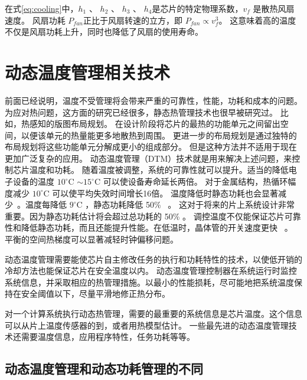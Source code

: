 在式\eqref{eq:cooling}中，$h_1$ 、 $h_2$ 、 $h_3$ 、 $h_4$是芯片的特定物理系数，$v_f$ 是散热风扇速度。
风扇功耗 $P_{fan}$正比于风扇转速的立方，即 $P_{fan} \propto v_f^3$。
这意味着高的温度不仅是风扇功耗上升，同时也降低了风扇的使用寿命。

\section{动态温度管理相关技术}\label{sec:DTM}

前面已经说明，温度不受管理将会带来严重的可靠性，性能，功耗和成本的问题。
为应对热问题，这方面的研究已经很多，静态热管理技术也很早被研究过。
比如，热感知的版图布局规划。
在设计阶段将芯片的最热的功能单元之间留出空间，以便该单元的热量能更多地散热到周围。
更进一步的布局规划是通过独特的布局规划将这些功能单元分解成更小的组成部分。
但是这种方法并不适用于现在更加广泛复杂的应用。
动态温度管理（DTM）技术就是用来解决上述问题，来控制芯片温度和功耗。
随着温度被调整，系统的可靠性就可以提升。适当的降低电子设备的温度 $10^{\circ}$C $\sim 15^{\circ}$C 可以使设备寿命延长两倍。
对于金属结构，热循环幅度减少 $10^{\circ}$C 可以使平均失效时间增长16倍。
温度降低时静态功耗也会显著减少~\cite{kursun2006investigating}。温度每降低 $9^{\circ}$C ，静态功耗降低 50\%~\cite{liu2007accurate} 。
这对于将来的片上系统设计非常重要。因为静态功耗估计将会超过总功耗的 50\% 。
调控温度不仅能保证芯片可靠性和降低静态功耗，而且还能提升性能。在低温时，晶体管的开关速度更快~\cite{pamula2003cooling} 。
平衡的空间热梯度可以显著减轻时钟偏移问题。

动态温度管理需要能使芯片自主修改任务的执行和功耗特性的技术，以使低开销的冷却方法也能保证芯片在安全温度以内。
动态温度管理控制器在系统运行时监控系统信息，并采取相应的热管理措施。以最小的性能损耗，尽可能地把系统温度保持在安全阈值以下，尽量平滑地修正热分布。

对一个计算系统执行动态热管理，需要的最重要的系统信息是芯片温度。这个信息可以从片上温度传感器的到，或者用热模型估计。
一些最先进的动态温度管理技术还需要温度信息，应用程序特性，任务功耗等等。

\subsection{动态温度管理和动态功耗管理的不同}\label{sec:DPM}

